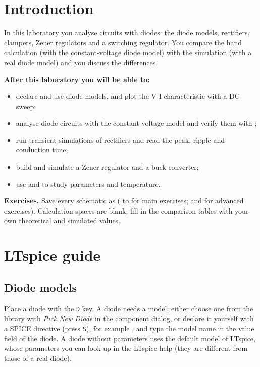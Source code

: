 
\section{Introduction}
In this laboratory you analyse circuits with diodes: the diode models, rectifiers, clampers, Zener regulators and a switching regulator. You compare the hand calculation (with the constant-voltage diode model) with the simulation (with a real diode model) and you discuss the differences.

\textbf{After this laboratory you will be able to:}
\begin{itemize}
  \item declare and use diode models, and plot the V-I characteristic with a DC sweep;
  \item analyse diode circuits with the constant-voltage model and verify them with ;
  \item run transient simulations of rectifiers and read the peak, ripple and conduction time;
  \item build and simulate a Zener regulator and a buck converter;
  \item use  and  to study parameters and temperature.
\end{itemize}

\textbf{Exercises.} Save every schematic as  ( to  for main exercises;  and  for advanced exercises). Calculation spaces are blank; fill in the comparison tables with your own theoretical and simulated values.

\section{LTspice guide}

\subsection{Diode models}
Place a diode with the \texttt{D} key. A diode needs a model: either choose one from the library with \textit{Pick New Diode} in the component dialog, or declare it yourself with a SPICE directive (press \texttt{S}), for example , and type the model name in the value field of the diode. A diode without parameters uses the default model of LTspice, whose parameters you can look up in the LTspice help (they are different from those of a real diode).

